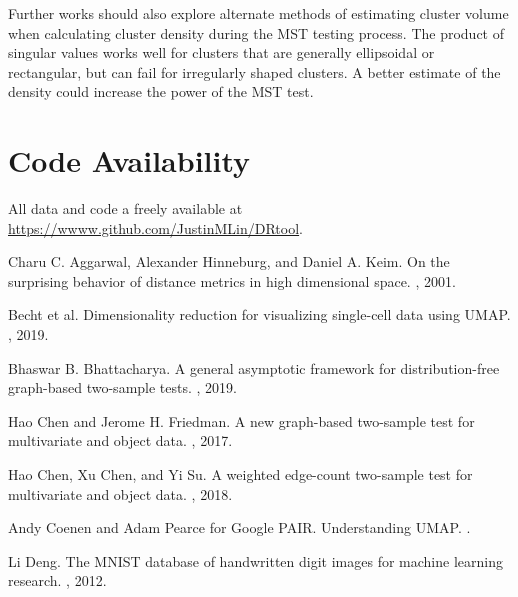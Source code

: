 \documentclass{article}
\begin{document}
{Further works should also explore alternate methods of estimating cluster volume when calculating cluster density during the MST testing process. The product of singular values works well for clusters that are generally ellipsoidal or rectangular, but can fail for irregularly shaped clusters. A better estimate of the density could increase the power of the MST test.

\section{Code Availability}
All data and code a freely available at \url{https://wwww.github.com/JustinMLin/DRtool}.

\newpage

\begin{thebibliography}{99}

Charu C. Aggarwal, Alexander Hinneburg, and Daniel A. Keim.
\newblock On the surprising behavior of distance metrics in high dimensional space.
, 2001.

Becht et al.
\newblock Dimensionality reduction for visualizing single-cell data using UMAP.
, 2019.

Bhaswar B. Bhattacharya.
\newblock A general asymptotic framework for distribution-free graph-based two-sample tests.
, 2019.

Hao Chen and Jerome H. Friedman.
\newblock A new graph-based two-sample test for multivariate and object data.
, 2017.

Hao Chen, Xu Chen, and Yi Su.
\newblock A weighted edge-count two-sample test for multivariate and object data.
, 2018.

Andy Coenen and Adam Pearce for Google PAIR.
\newblock Understanding UMAP.
.

Li Deng.
\newblock The MNIST database of handwritten digit images for machine learning research.
, 2012.


\end{thebibliography}}
\end{document}
